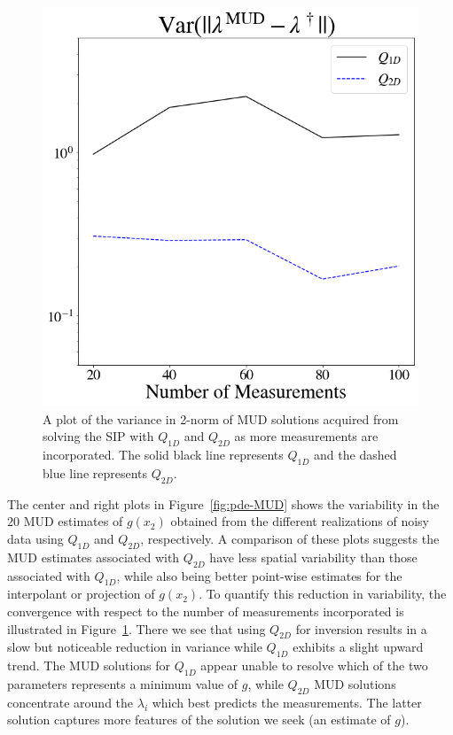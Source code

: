 \begin{figure}[htbp]
\centering
    \includegraphics[width=0.45\linewidth]{figures/pde-highd/pde-highd_convergence.png}
\caption{
A plot of the variance in 2-norm of MUD solutions acquired from solving the SIP with $Q_{1D}$ and $Q_{2D}$ as more measurements are incorporated.
The solid black line represents $Q_{1D}$ and the dashed blue line represents $Q_{2D}$.
}
\label{fig:pde-convergence}
\end{figure}


The center and right plots in Figure~\ref{fig:pde-MUD} shows the variability in the $20$ MUD estimates of $g(x_2)$ obtained from the different realizations of noisy data using $Q_{1D}$ and $Q_{2D}$, respectively.
A comparison of these plots suggests the MUD estimates associated with $Q_{2D}$ have less spatial variability than those associated with $Q_{1D}$, while also being better point-wise estimates for the interpolant or projection of $g(x_2)$.
To quantify this reduction in variability, the convergence with respect to the number of measurements incorporated is illustrated in Figure~\ref{fig:pde-convergence}.
There we see that using $Q_{2D}$ for inversion results in a slow but noticeable reduction in variance while $Q_{1D}$ exhibits a slight upward trend.
The MUD solutions for $Q_{1D}$ appear unable to resolve which of the two parameters represents a minimum value of $g$, while $Q_{2D}$ MUD solutions concentrate around the $\lambda_i$ which best predicts the measurements.
The latter solution captures more features of the solution we seek (an estimate of $g$).
